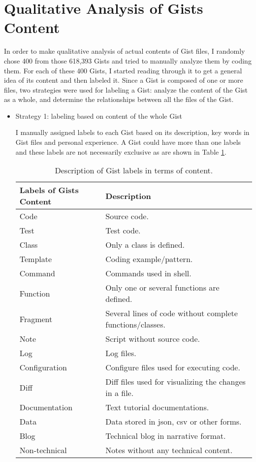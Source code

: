 \section{Qualitative Analysis of Gists Content}

In order to make qualitative analysis of actual contents of Gist files, I randomly chose 400 from those 618,393 Gists and tried to manually analyze them by coding them. For each of these 400 Gists, I started reading through it to get a general idea of its content and then labeled it. Since a Gist is composed of one or more files, two strategies were used for labeling a Gist: analyze the content of the Gist as a whole, and determine the relationships between all the files of the Gist.  

\begin{itemize}

  \item Strategy 1: labeling based on content of the whole Gist

  I manually assigned labels to each Gist based on its description, key words in Gist files and personal experience. A Gist could have more than one labels and these labels are not necessarily exclusive as are shown in Table \ref{tb:gistcontentlabels}.

\begin{table}[!htb]
 \begin{center}
 \begin{tabular}{ll} 
   \textbf{Labels of Gists Content}	&	\textbf{Description}\\ \hline
   Code & Source code.\\
   Test & Test code.\\ 
   Class & Only a class is defined.\\ 
   Template & Coding example/pattern.\\ 
   Command & Commands used in shell.\\ 
   Function & Only one or several functions are defined.\\ 
   Fragment & Several lines of code without complete functions/classes.\\
   Note & Script without source code.\\ 
   Log & Log files.\\ 
   Configuration & Configure files used for executing code.\\ 
   Diff & Diff files used for visualizing the changes in a file.\\ 
   Documentation & Text tutorial documentations.\\ 
   Data & Data stored in json, csv or other forms.\\ 
   Blog & Technical blog in narrative format.\\ 
   Non-technical & Notes without any technical content.\\ \hline
 \end{tabular}
 \end{center}
 \caption{Description of Gist labels in terms of content.}
 \label{tb:gistcontentlabels}
\end{table}


\end{itemize}
